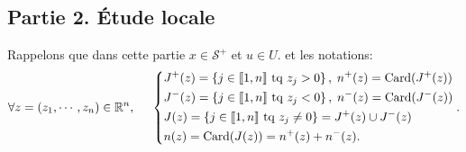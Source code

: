 \subsection*{Partie 2. \'Etude locale}
Rappelons que dans cette partie $x \in \mathcal{S}^+$ et $u \in U$. et les notations: 
\[
\forall z = (z_1, \cdots, z_n) \in \mathbb{R}^n, \hspace{0.5cm}
\left\lbrace
\begin{aligned}
  &J^+(z) = \left\lbrace j \in \llbracket 1 ,n \rrbracket \text{ tq } z_j > 0\right\rbrace, \; n^+(z) = \operatorname{Card} (J^+(z))\\ 
  &J^-(z) = \left\lbrace j \in \llbracket 1 ,n \rrbracket \text{ tq } z_j < 0\right\rbrace, \; n^-(z) = \operatorname{Card} (J^-(z))\\
  &J(z) = \left\lbrace j \in \llbracket 1 ,n \rrbracket \text{ tq } z_j \neq 0\right\rbrace = J^+(z) \cup J^-(z)\\
  &n(z) = \operatorname{Card} (J(z)) = n^+(z) + n^-(z).
\end{aligned}
\right. .
\]

